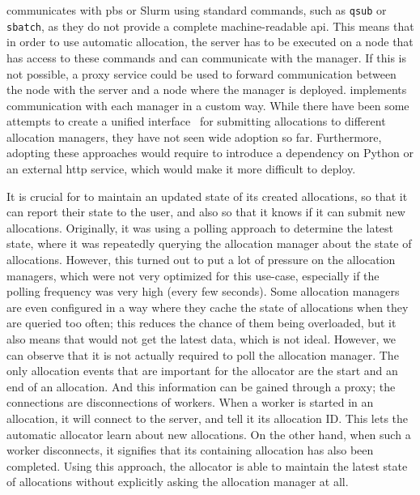 \hyperqueue{} communicates with \gls{pbs} or Slurm using standard
commands, such as \texttt{qsub} or \texttt{sbatch}, as they do not provide a complete
machine-readable \gls{api}. This means that in order to use automatic allocation, the server has to
be executed on a node that has access to these commands and can communicate with the manager. If
this is not possible, a proxy service could be used to forward communication between the node
with the server and a node where the manager is deployed. \hyperqueue{} implements communication
with each manager in a custom way. While there have been some attempts to create a unified
interface~\cite{psij,workflow-alloc-manager-comm} for submitting allocations to different
allocation managers, they have not seen wide adoption so far. Furthermore, adopting these
approaches would require \hq{} to introduce a dependency on Python or an external \gls{http}
service, which would make it more difficult to deploy.

It is crucial for \autoalloc{} to maintain an updated state of its created allocations,
so that it can report their state to the user, and also so that it knows if it can submit new
allocations. Originally, it was using a polling approach to determine the latest state, where it
was repeatedly querying the allocation manager about the state of allocations. However, this turned
out to put a lot of pressure on the allocation managers, which were not very optimized for this
use-case, especially if the polling frequency was very high (every few seconds). Some allocation
managers are even configured in a way where they cache the state of allocations when they are
queried too often; this reduces the chance of them being overloaded, but it also means that
\hyperqueue{} would not get the latest data, which is not ideal. However, we can observe
that it is not actually required to poll the allocation manager. The only allocation events that
are important for the allocator are the start and an end of an allocation. And this information can
be gained through a proxy; the connections are disconnections of \hq{} workers.
When a worker is started in an allocation, it will connect to the server, and tell it its
allocation ID\@. This lets the automatic allocator learn about new allocations. On the other hand,
when such a worker disconnects, it signifies that its containing allocation has also been
completed. Using this approach, the allocator is able to maintain the latest state of allocations
without explicitly asking the allocation manager at all.

